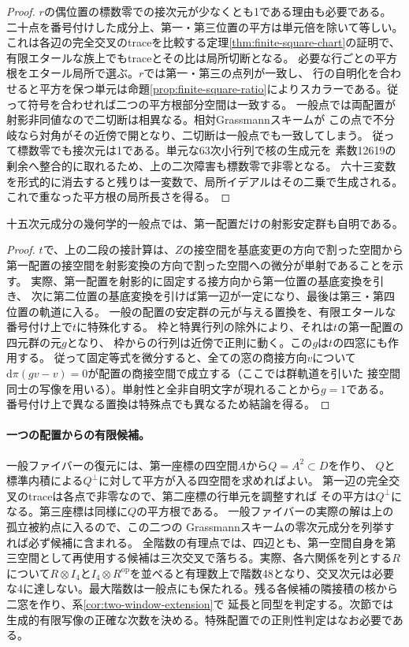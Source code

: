 \begin{proof}
$r$の偶位置の標数零での接次元が少なくとも1である理由も必要である。
二十点を番号付けした成分上、第一・第三位置の平方は単元倍を除いて等しい。
これは各辺の完全交叉のtraceを比較する定理\ref{thm:finite-square-chart}の証明で、
有限エタールな族上でもtraceとその比は局所切断となる。
必要な行ごとの平方根をエタール局所で選ぶ。$r$では第一・第三の点列が一致し、
行の自明化を合わせると平方を保つ単元は命題\ref{prop:finite-square-ratio}によりスカラーである。従って符号を合わせれば二つの平方根部分空間は一致する。
一般点では両配置が射影非同値なので二切断は相異なる。相対Grassmannスキームが
この点で不分岐なら対角がその近傍で開となり、二切断は一般点でも一致してしまう。
従って標数零でも接次元は1である。単元な63次小行列で核の生成元を
素数12619の剰余へ整合的に取れるため、上の二次障害も標数零で非零となる。
六十三変数を形式的に消去すると残りは一変数で、局所イデアルはその二乗で生成される。
これで重なった平方根の局所長さを得る。
\end{proof}

\begin{corollary}
十五次元成分の幾何学的一般点では、第一配置だけの射影安定群も自明である。
\end{corollary}
\begin{proof}
$t$で、上の二段の接計算は、$Z$の接空間を基底変更の方向で割った空間から
第一配置の接空間を射影変換の方向で割った空間への微分が単射であることを示す。
実際、第一配置を射影的に固定する接方向から第一位置の基底変換を引き、
次に第二位置の基底変換を引けば第一辺が一定になり、最後は第三・第四位置の軌道に入る。
一般の配置の安定群の元が与える置換を、有限エタールな番号付け上で$t$に特殊化する。
枠と特異行列の除外により、それは$t$の第一配置の四元群の元$g$となり、
枠からの行列は近傍で正則に動く。この$g$は$t$の四窓にも作用する。
従って固定等式を微分すると、全ての窓の商接方向$v$について
$\mathrm d\pi(gv-v)=0$が配置の商接空間で成立する（ここでは群軌道を引いた
接空間同士の写像を用いる）。単射性と全非自明文字が現れることから$g=1$である。
番号付け上で異なる置換は特殊点でも異なるため結論を得る。
\end{proof}

\paragraph{一つの配置からの有限候補。}
一般ファイバーの復元には、第一座標の四空間$A$から$Q=A^2\subset D$を作り、
$Q$と標準内積による$Q^\perp$に対して平方が入る四空間を求めればよい。
第一辺の完全交叉のtraceは各点で非零なので、第二座標の行単元を調整すれば
その平方は$Q^\perp$になる。第三座標は同様に$Q$の平方根である。
一般ファイバーの実際の解は上の孤立被約点に入るので、この二つの
Grassmannスキームの零次元成分を列挙すれば必ず候補に含まれる。
全階数の有理点では、四辺とも、第一空間自身を第三空間として再使用する候補は三次交叉で落ちる。実際、各六関係を列とする$R$について$R\otimes I_4$と$I_4\otimes R^{\mathrm{op}}$を並べると有理数上で階数48となり、交叉次元は必要な4に達しない。最大階数は一般点にも保たれる。残る各候補の隣接積の核から二窓を作り、系\ref{cor:two-window-extension}で
延長と同型を判定する。次節では生成的有限写像の正確な次数を決める。特殊配置での正則性判定はなお必要である。

